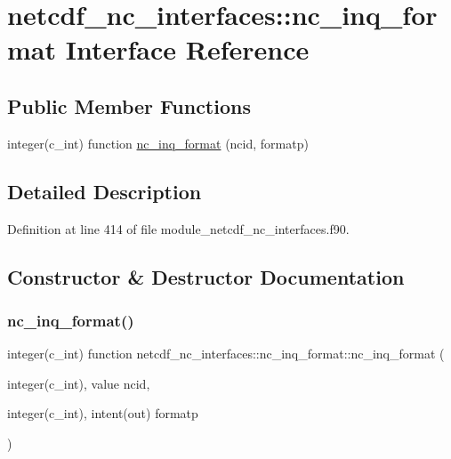 \hypertarget{interfacenetcdf__nc__interfaces_1_1nc__inq__format}{}\section{netcdf\+\_\+nc\+\_\+interfaces\+:\+:nc\+\_\+inq\+\_\+format Interface Reference}
\label{interfacenetcdf__nc__interfaces_1_1nc__inq__format}
\subsection*{Public Member Functions}
\begin{DoxyCompactItemize}
\item 
integer(c\+\_\+int) function \hyperlink{interfacenetcdf__nc__interfaces_1_1nc__inq__format_a35c941d77e41cd016e7d444316e38280}{nc\+\_\+inq\+\_\+format} (ncid, formatp)
\end{DoxyCompactItemize}


\subsection{Detailed Description}


Definition at line 414 of file module\+\_\+netcdf\+\_\+nc\+\_\+interfaces.\+f90.



\subsection{Constructor \& Destructor Documentation}
\mbox{\label{interfacenetcdf__nc__interfaces_1_1nc__inq__format_a35c941d77e41cd016e7d444316e38280}} 
\subsubsection{\texorpdfstring{nc\+\_\+inq\+\_\+format()}{nc\_inq\_format()}}
{\footnotesize\ttfamily integer(c\+\_\+int) function netcdf\+\_\+nc\+\_\+interfaces\+::nc\+\_\+inq\+\_\+format\+::nc\+\_\+inq\+\_\+format (\begin{DoxyParamCaption}\item[{integer(c\+\_\+int), value}]{ncid,  }\item[{integer(c\+\_\+int), intent(out)}]{formatp }\end{DoxyParamCaption})}



